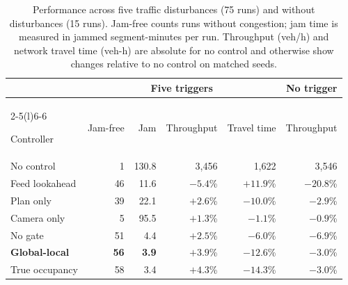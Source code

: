 \documentclass[letterpaper, 10pt, journal, twoside]{IEEEtran}
\begin{document}
\begin{table}[t]

\centering

\caption{Performance across five traffic disturbances (75 runs) and without disturbances (15 runs). Jam-free counts runs without congestion; jam time is measured in jammed segment-minutes per run. Throughput (veh/h) and network travel time (veh-h) are absolute for no control and otherwise show changes relative to no control on matched seeds.}

\label{tab:main}

\footnotesize

\setlength{\tabcolsep}{2.2pt}

\begin{tabular}{@{}lrrrrr@{}}

\toprule

& \multicolumn{4}{c}{Five triggers} & No trigger \\

\cmidrule(lr){2-5}\cmidrule(l){6-6}

Controller & Jam-free & Jam & Throughput & Travel time & Throughput \\

\midrule

No control & 1 & 130.8 & 3,456 & 1,622 & 3,546 \\

Feed lookahead & 46 & 11.6 & $-5.4$\% & $+11.9$\% & $-20.8$\% \\

Plan only & 39 & 22.1 & $+2.6$\% & $-10.0$\% & $-2.9$\% \\

Camera only & 5 & 95.5 & $+1.3$\% & $-1.1$\% & $-0.9$\% \\

No gate & 51 & 4.4 & $+2.5$\% & $-6.0$\% & $-6.9$\% \\

\textbf{Global-local} & \textbf{56} & \textbf{3.9} & $\mathbf{+3.9}$\% & $\mathbf{-12.6}$\% & $\mathbf{-3.0}$\% \\

True occupancy & 58 & 3.4 & $+4.3$\% & $-14.3$\% & $-3.0$\% \\

\bottomrule
\end{tabular}
\end{table}
\end{document}
